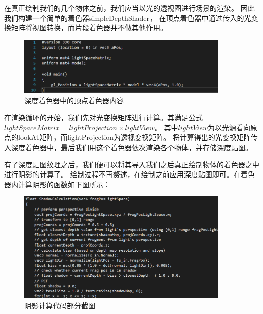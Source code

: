 \documentclass[UTF8]{ctexart}
\begin{document}
\par
在真正绘制我们的几个物体之前，我们应当以光的透视图进行场景的渲染。
因此我们构建一个简单的着色器simpleDepthShader，
在顶点着色器中通过传入的光变换矩阵将视图转换，而片段着色器并不做其他作用。

\begin{figure}[h]
	\centering
	\includegraphics*[width=0.9\textwidth]{5.png}
	\caption{深度着色器中的顶点着色器内容}
	\label{fig:5}
\end{figure}

\par
在渲染循环的开始，我们先对光变换矩阵进行计算。其满足公式\\$lightSpaceMatrix = lightProjection \times lightView$。
其中$lightView$为以光源看向原点的lookAt矩阵，而lightProjection为透视变换矩阵。
将计算得出的光变换矩阵传入深度着色器中，最后我们用这个着色器依次渲染各个物体，并存储深度贴图。

\par
有了深度贴图纹理之后，我们便可以将其导入我们之后真正绘制物体的着色器之中进行阴影的计算了。
绘制过程不再赘述，在绘制之前应用深度贴图即可。在着色器内计算阴影的函数如下图所示：

\begin{figure}[h]
	\centering
	\includegraphics*[width=0.9\textwidth]{6.png}
	\caption{阴影计算代码部分截图}
	\label{fig:6}
\end{figure}
\end{document}
